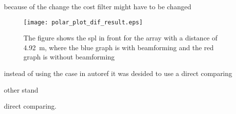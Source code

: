 because of the change the cost filter might have to be changed 


 \begin{figure}[H]
	\centering
	\texttt{[image: polar\_plot\_dif\_result.eps]}
	\caption{The figure shows the \gls{spl} in front for the array with a distance of \SI{4.92}{\meter}, where the blue graph is with beamforming and the red graph is without beamforming}
		\label{fig:polar_plot_dif_result}
\end{figure}


instead of using the case in autoref{} it was desided to use a direct comparing 

other stand

direct comparing.